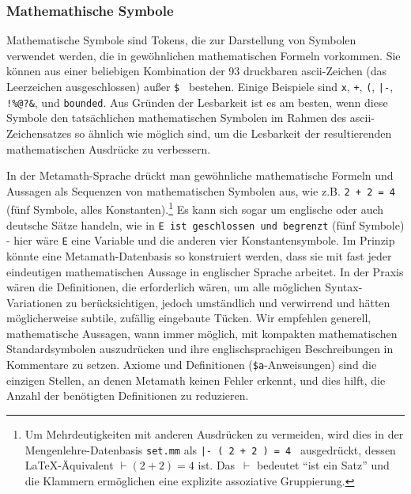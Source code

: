 \subsubsection{Mathemathische Symbole}

Mathematische Symbole sind Tokens, die zur Darstellung von Symbolen verwendet werden, die in gewöhnlichen mathematischen Formeln vorkommen.  Sie können aus einer beliebigen Kombination der 93 druckbaren {\sc ascii}-Zeichen (das Leerzeichen ausgeschlossen) außer \texttt{\$}~ bestehen. Einige Beispiele sind \texttt{x}, \texttt{+}, \texttt{(}, \texttt{|-}, \verb$!%@?&$, und \texttt{bounded}.  Aus Gründen der Lesbarkeit ist es am besten, wenn diese Symbole den tatsächlichen mathematischen Symbolen im Rahmen des {\sc ascii}-Zeichensatzes so ähnlich wie möglich sind, um die Lesbarkeit der resultierenden mathematischen Ausdrücke zu verbessern.

In der Metamath-Sprache drückt man gewöhnliche mathematische Formeln und Aussagen als Sequenzen von mathematischen Symbolen aus, wie z.B. \texttt{2 + 2 = 4} (fünf Symbole, alles Konstanten).\footnote{Um Mehrdeutigkeiten mit anderen Ausdrücken zu vermeiden, wird dies in der Mengenlehre-Datenbasis \texttt{set.mm} als \texttt{|- ( 2 + 2 ) = 4 } ausgedrückt, dessen \LaTeX-Äquivalent $\vdash (2+2)=4$ ist.  Das \,$\vdash$ bedeutet "`ist ein Satz"' und die Klammern ermöglichen eine explizite assoziative Gruppierung.} Es kann sich sogar um englische oder auch deutsche Sätze handeln, wie in \texttt{E ist geschlossen und begrenzt} (fünf Symbole) - hier wäre \texttt{E} eine Variable und die anderen vier Konstantensymbole.  Im Prinzip könnte eine Metamath-Datenbasis so konstruiert werden, dass sie mit fast jeder eindeutigen mathematischen Aussage in englischer Sprache arbeitet. In der Praxis wären die Definitionen, die erforderlich wären, um alle möglichen Syntax-Variationen zu berücksichtigen, jedoch umständlich und verwirrend und hätten möglicherweise subtile, zufällig eingebaute Tücken.  Wir empfehlen generell, mathematische Aussagen, wann immer möglich, mit kompakten mathematischen Standardsymbolen auszudrücken und ihre englischsprachigen Beschreibungen in Kommentare zu setzen.
Axiome und Definitionen (\texttt{\$a}-Anweisungen) sind die einzigen Stellen, an denen Metamath keinen Fehler erkennt, und dies hilft, die Anzahl der benötigten Definitionen zu reduzieren.

